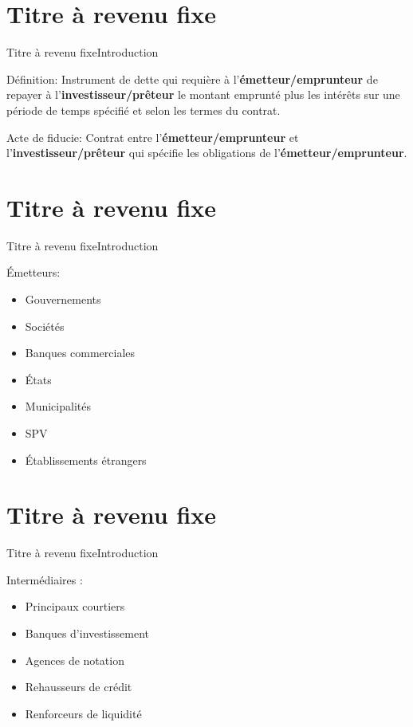 \documentclass{beamer}
\begin{document}
\section{Titre à revenu fixe}
\begin{frame}{Titre à revenu fixe}{Introduction}
\begin{block}{Définition:}
Instrument de dette qui requière à l’\textbf{émetteur/emprunteur} de repayer à l’\textbf{investisseur/prêteur} le montant emprunté plus les intérêts sur une période de temps spécifié et selon les termes du contrat.
\end{block}
\begin{block}{Acte de fiducie:}
Contrat entre l’\textbf{émetteur/emprunteur} et l’\textbf{investisseur/prêteur} qui spécifie les obligations de l’\textbf{émetteur/emprunteur}.
\end{block}
\end{frame}


\section{Titre à revenu fixe}
\begin{frame}{Titre à revenu fixe}{Introduction}
\begin{block}{Émetteurs:}
\begin{itemize}
\item Gouvernements
\item Sociétés
\item Banques commerciales 
\item États
\item Municipalités
\item SPV
\item Établissements étrangers
\end{itemize}
\end{block}
\end{frame}



\section{Titre à revenu fixe}
\begin{frame}{Titre à revenu fixe}{Introduction}
\begin{block}{Intermédiaires :}
\begin{itemize}
\item Principaux courtiers 
\item Banques d'investissement
\item Agences de notation 
\item Rehausseurs de crédit
\item Renforceurs de liquidité
\end{itemize}
\end{block}
\end{frame}
\end{document}
